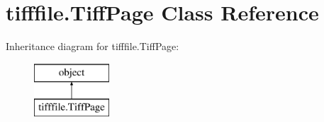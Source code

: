 \hypertarget{classtifffile_1_1TiffPage}{\section{tifffile.\-Tiff\-Page Class Reference}
\label{classtifffile_1_1TiffPage}
}
Inheritance diagram for tifffile.\-Tiff\-Page\-:\begin{figure}[H]
\begin{center}
\leavevmode
\includegraphics[height=2.000000cm]{classtifffile_1_1TiffPage}
\end{center}
\end{figure}
